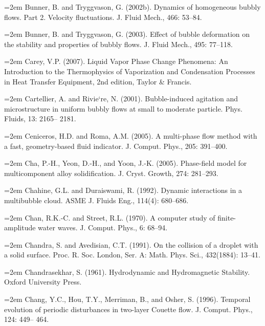 \documentclass[11pt,a4paper,openany,fontset=none]{ctexbook}
\begin{document}
\par\hangindent=2em Bunner, B. and Tryggvason, G. (2002b). Dynamics of homogeneous bubbly flows. Part 2. Velocity fluctuations. J. Fluid Mech., 466: 53--84.

\par\hangindent=2em Bunner, B. and Tryggvason, G. (2003). Effect of bubble deformation on the stability and properties of bubbly flows. J. Fluid Mech., 495: 77--118.

\par\hangindent=2em Carey, V.P. (2007). Liquid Vapor Phase Change Phenomena: An Introduction to the Thermophysics of Vaporization and Condensation Processes in Heat Transfer Equipment, 2nd edition, Taylor \& Francis.

\par\hangindent=2em Cartellier, A. and Rivie`re, N. (2001). Bubble-induced agitation and microstructure in uniform bubbly flows at small to moderate particle. Phys. Fluids, 13: 2165-- 2181.

\par\hangindent=2em Ceniceros, H.D. and Roma, A.M. (2005). A multi-phase flow method with a fast, geometry-based fluid indicator. J. Comput. Phys., 205: 391--400.

\par\hangindent=2em Cha, P.-H., Yeon, D.-H., and Yoon, J.-K. (2005). Phase-field model for multicomponent alloy solidification. J. Cryst. Growth, 274: 281--293.

\par\hangindent=2em Chahine, G.L. and Duraiswami, R. (1992). Dynamic interactions in a multibubble cloud. ASME J. Fluids Eng., 114(4): 680--686.

\par\hangindent=2em Chan, R.K.-C. and Street, R.L. (1970). A computer study of finite-amplitude water waves. J. Comput. Phys., 6: 68--94.


\par\hangindent=2em Chandra, S. and Avedisian, C.T. (1991). On the collision of a droplet with a solid surface. Proc. R. Soc. London, Ser. A: Math. Phys. Sci., 432(1884): 13--41.

\par\hangindent=2em Chandrasekhar, S. (1961). Hydrodynamic and Hydromagnetic Stability. Oxford University Press.

\par\hangindent=2em Chang, Y.C., Hou, T.Y., Merriman, B., and Osher, S. (1996). Temporal evolution of periodic disturbances in two-layer Couette flow. J. Comput. Phys., 124: 449-- 464.
\end{document}
